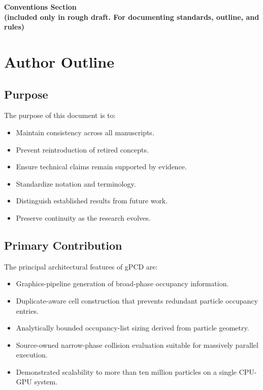 \newpage
\clearpage
\begin{center}
\Large\textbf{Conventions Section\\ (included only in rough draft. For documenting standards, outline, and rules)}
\end{center}
\section{Author Outline}

\subsection{Purpose}

The purpose of this document is to:

\begin{itemize}
\item Maintain consistency across all manuscripts.
\item Prevent reintroduction of retired concepts.
\item Ensure technical claims remain supported by evidence.
\item Standardize notation and terminology.
\item Distinguish established results from future work.
\item Preserve continuity as the research evolves.
\end{itemize}

\subsection{Primary Contribution}

The principal architectural features of gPCD are:

\begin{itemize}
\item Graphics-pipeline generation of broad-phase occupancy information.
\item Duplicate-aware cell construction that prevents redundant particle occupancy entries.
\item Analytically bounded occupancy-list sizing derived from particle geometry.
\item Source-owned narrow-phase collision evaluation suitable for massively parallel execution.
\item Demonstrated scalability to more than ten million particles on a single CPU-GPU system.
\end{itemize}


